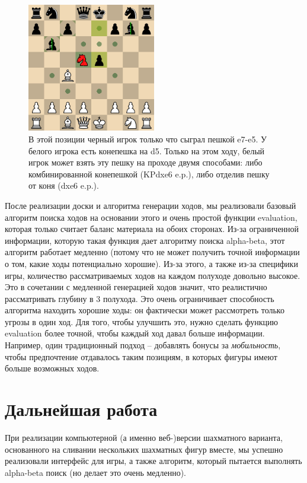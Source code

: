 \documentclass{article}
\begin{document}
\begin{figure}[h]
    \centering
    \includegraphics[width=0.5\textwidth]{img/enpassant-demo.png}
    \caption{
        В этой позиции черный игрок только что сыграл пешкой e7-e5. У белого игрока есть конепешка на d5.
        Только на этом ходу, белый игрок может взять эту пешку на проходе
        двумя способами: либо комбинированной конепешкой (KPdxe6 e.p.),
        либо отделив пешку от коня (dxe6 e.p.).
    }
\end{figure}


После реализации доски 
и алгоритма генерации ходов,
мы реализовали базовый алгоритм поиска ходов на основании этого
и очень простой функции evaluation,
которая только считает баланс материала на обоих сторонах.
Из-за ограниченной информации, которую такая функция дает алгоритму поиска alpha-beta,
этот алгоритм работает медленно (потому что не может получить точной информации о том, какие ходы потенциально хорошие).
Из-за этого, а также из-за специфики игры,
количество рассматриваемых ходов на каждом полуходе довольно высокое.
Это в сочетании с медленной генерацией ходов значит,
что реалистично рассматривать глубину в 3 полухода.
Это очень ограничивает способность алгоритма находить хорошие ходы:
он фактически может рассмотреть только угрозы в один ход.
Для того, чтобы улучшить это, нужно сделать функцию evaluation
более точной,
чтобы каждый ход давал больше информации.
Например, один традиционный подход -- 
добавлять бонусы за \emph{мобильность},
чтобы предпочтение отдавалось таким позициям,
в которых фигуры имеют больше возможных ходов.


\section{Дальнейшая работа}

При реализации компьютерной (а именно веб-)версии шахматного варианта,
основанного на сливании нескольких шахматных фигур вместе,
мы успешно реализовали интерфейс для игры,
а также алгоритм, который пытается выполнять alpha-beta поиск (но делает это очень медленно).
\end{document}
